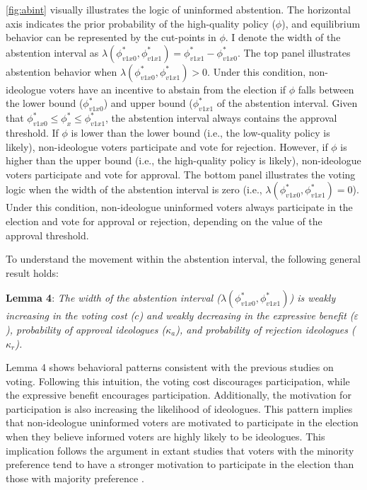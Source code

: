 \documentclass[doc,natbib,12pt]{apa6}
\begin{document}
	\par \autoref{fig:abint} visually illustrates the logic of uninformed abstention. The horizontal axis indicates the prior probability of the high-quality policy ($\phi$), and equilibrium behavior can be represented by the cut-points in $\phi$. I denote the width of the abstention interval as $\lambda(\phi^*_{v1x0},  \phi^*_{v1x1}) = \phi^*_{v1x1} - \phi^*_{v1x0}$. The top panel illustrates abstention behavior when $\lambda(\phi^*_{v1x0},  \phi^*_{v1x1}) > 0$. Under this condition, non-ideologue voters have an incentive to abstain from the election if $\phi$ falls between the lower bound ($\phi^*_{v1x0}$) and upper bound ($\phi^*_{v1x1}$ of the abstention interval. Given that $\phi^*_{v1x0} \leq  \phi^*_x \leq  \phi^*_{v1x1}$, the abstention interval always contains the approval threshold. If $\phi$ is lower than the lower bound (i.e., the low-quality policy is likely), non-ideologue voters participate and vote for rejection. However, if $\phi$ is higher than the upper bound (i.e., the high-quality policy is likely), non-ideologue voters participate and vote for approval. The bottom panel illustrates the voting logic when the width of the abstention interval is zero (i.e., $\lambda(\phi^*_{v1x0},  \phi^*_{v1x1}) =0$). Under this condition, non-ideologue uninformed voters always participate in the election and vote for approval or rejection, depending on the value of the approval threshold. 
	
	\par To understand the movement within the abstention interval, the following general result holds: 
	
	\noindent \textbf{Lemma 4}: \textit{The width of the abstention interval ($\lambda(\phi^*_{v1x0},  \phi^*_{v1x1})$) is weakly increasing in the voting cost ($c$) and weakly decreasing in the expressive benefit ($\varepsilon$), probability of approval ideologues ($\kappa_a$), and probability of rejection ideologues ($\kappa_r$).}
	
	\noindent Lemma 4 shows behavioral patterns consistent with the previous studies on voting. Following this intuition, the voting cost discourages participation, while the expressive benefit encourages participation. Additionally, the motivation for participation is also increasing the likelihood of ideologues. This pattern implies that non-ideologue uninformed voters are motivated to participate in the election when they believe informed voters are highly likely to be ideologues. This implication follows the argument in extant studies that voters with the minority preference tend to have a stronger motivation to participate in the election than those with majority preference \citep{Taylor2010puin, Cantoni2017pras}.
	
\end{document}
